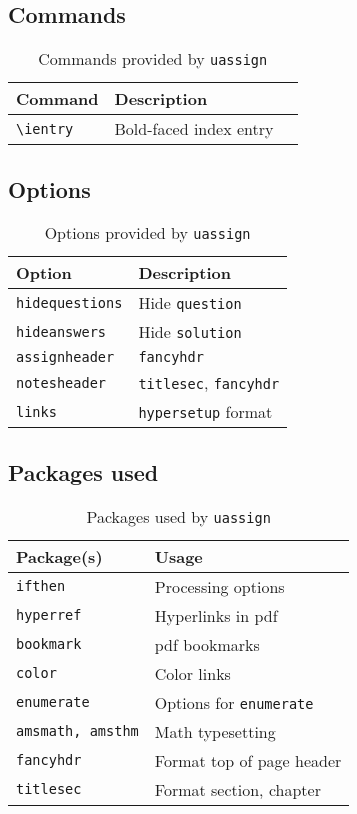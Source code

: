 \documentclass[twocolumn,twoside,11pt]{report}
\begin{document}
\vspace{10mm}
\subsection{Commands}

\begin{table}[!htpb]
\centering
\begin{tabular}{l l l}
\hline
Command & Description \\ \hline
\verb|\ientry| & Bold-faced index entry \\ \hline
\end{tabular}
\caption{Commands provided by \texttt{uassign}}
\end{table}

\subsection{Options}

\begin{table}[!htpb]
\centering
\begin{tabular}{l l}
\hline
Option & Description \\ \hline
\verb|hidequestions| & Hide \texttt{question} \\
\verb|hideanswers| & Hide \texttt{solution} \\ 
\verb|assignheader| & \texttt{fancyhdr} \\ 
\verb|notesheader| & \texttt{titlesec}, \texttt{fancyhdr} \\ 
\verb|links| & \texttt{hypersetup} format \\ \hline
\end{tabular}
\caption{Options provided by \texttt{uassign}}
\end{table}

\subsection{Packages used}

\begin{table}[!htpb]
\centering
\begin{tabular}{l l}
\hline
Package(s) & Usage \\ \hline
\texttt{ifthen} & Processing options \\ 
\texttt{hyperref} & Hyperlinks in pdf \\
\texttt{bookmark} & pdf bookmarks \\ 
\texttt{color} & Color links \\ 
\texttt{enumerate} & Options for \texttt{enumerate} \\ 
\texttt{amsmath, amsthm} & Math typesetting \\ 
\texttt{fancyhdr} & Format top of page header \\
\texttt{titlesec} & Format section, chapter \\ \hline
\end{tabular}
\caption{Packages used by \texttt{uassign}}
\end{table}
\end{document}
